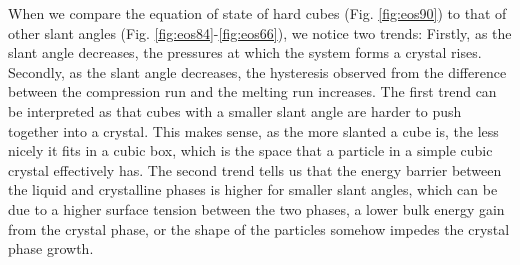 \documentclass[thesis]{subfiles}
\begin{document}
When we compare the equation of state of hard cubes (Fig. \ref{fig:eos90}) to that of other slant angles (Fig. \ref{fig:eos84}-\ref{fig:eos66}), we notice two trends: Firstly, as the slant angle decreases, the pressures at which the system forms a crystal rises. Secondly, as the slant angle decreases, the hysteresis observed from the difference between the compression run and the melting run increases.
The first trend can be interpreted as that cubes with a smaller slant angle are harder to push together into a crystal. This makes sense, as the more slanted a cube is, the less nicely it fits in a cubic box, which is the space that a particle in a simple cubic crystal effectively has. The second trend tells us that the energy barrier between the liquid and crystalline phases is higher for smaller slant angles, which can be due to a higher surface tension between the two phases, a lower bulk energy gain from the crystal phase, or the shape of the particles somehow impedes the crystal phase growth.
\end{document}

